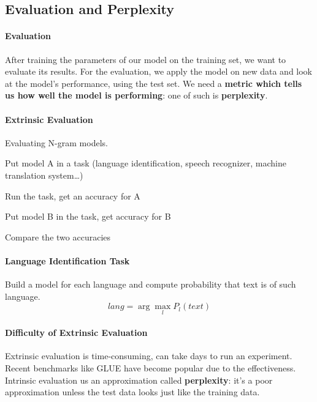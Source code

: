 \documentclass[10pt]{report}
\begin{document}
\subsection{Evaluation and Perplexity}
\paragraph{Evaluation} After training the parameters of our model on the training set, we want to evaluate its results. For the evaluation, we apply the model on new data and look at the model's performance, using the test set. We need a \textbf{metric which tells us how well the model is performing}: one of such is \textbf{perplexity}.
\paragraph{Extrinsic Evaluation} Evaluating N-gram models.\begin{list}{}{}
	\item Put model A in a task (language identification, speech recognizer, machine translation system\ldots)
	\item Run the task, get an accuracy for A
	\item Put model B in the task, get accuracy for B
	\item Compare the two accuracies
\end{list}
\paragraph{Language Identification Task} Build a model for each language and compute probability that text is of such language.
$$lang = \arg\max_l P_l(text)$$
\paragraph{Difficulty of Extrinsic Evaluation} Extrinsic evaluation is time-consuming, can take days to run an experiment. Recent benchmarks like GLUE have become popular due to the effectiveness.\\
Intrinsic evaluation us an approximation called \textbf{perplexity}: it's a poor approximation unless the test data looks just like the training data.
\end{document}
